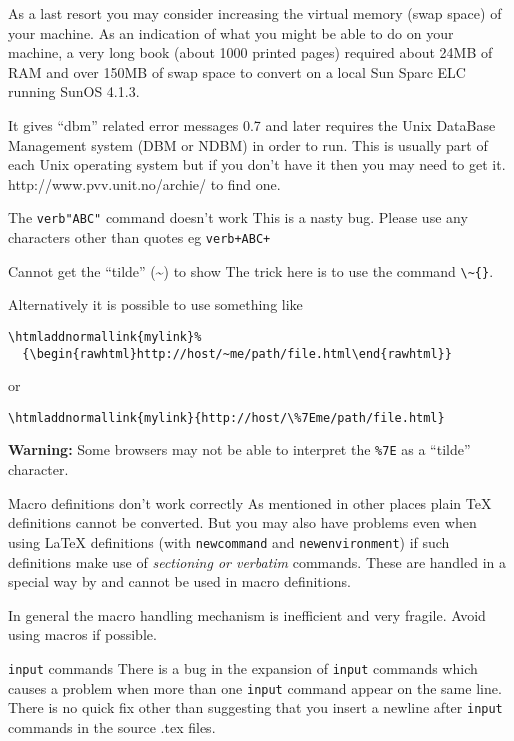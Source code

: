 \begin{htmllist}
As a last resort you may consider increasing the virtual memory
(swap space) of your machine. As an indication 
of what you might be able to do on your machine,
a very long book (about 1000 printed pages) required about 
24MB of RAM and over 150MB of swap space to convert on a local Sun Sparc ELC
running SunOS 4.1.3.

\item [It gives ``dbm'' related error messages]
\latextohtml{} 0.7 and later requires the
Unix DataBase Management system (DBM or NDBM) in order to run.
This is usually part of each Unix operating system but if you 
don't have it then you may need to get it. 
{http://www.pvv.unit.no/archie/} to find one.

\item [The \texttt{verb"ABC"} command doesn't work]
This is a nasty bug. Please use any characters other than quotes eg
\texttt{verb+ABC+}

\item [Cannot get the ``tilde'' (\~{}) to show]
The trick here is to use the command \verb|\~{}|. 

Alternatively it is possible to use something like \\
\begin{verbatim}
\htmladdnormallink{mylink}%
  {\begin{rawhtml}http://host/~me/path/file.html\end{rawhtml}}
\end{verbatim}

or

\verb|\htmladdnormallink{mylink}{http://host/\%7Eme/path/file.html}| 

\textbf{Warning:} Some browsers may not be able to interpret the \verb|%7E|
as a ``tilde'' character.

\item [Macro definitions don't work correctly]
As mentioned in other places plain TeX definitions cannot be
converted.
But you may also have problems even when using LaTeX definitions
(with \texttt{newcommand} and \texttt{newenvironment}) if such definitions
make use of {\it sectioning or verbatim} commands. These are 
handled in a special way by \latextohtml{} and cannot be used in
macro definitions. 

In general the macro handling mechanism is inefficient and very
fragile. Avoid using macros if possible.

\item [\texttt{input} commands]
There is a bug in the expansion of \texttt{input} commands which causes a problem
when more than one \texttt{input} command appear on the same line.
There is no quick fix other than suggesting that you 
insert a newline after \texttt{input} commands in the source .tex files.


\end{htmllist}

